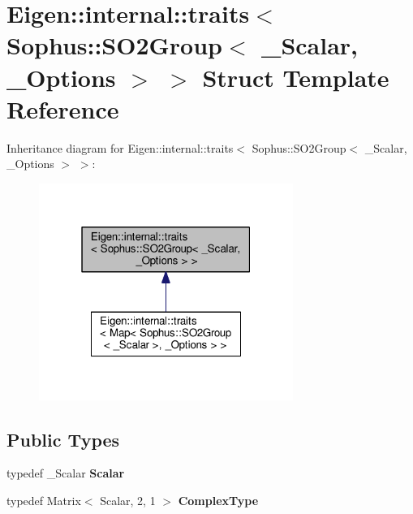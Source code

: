 \hypertarget{struct_eigen_1_1internal_1_1traits_3_01_sophus_1_1_s_o2_group_3_01___scalar_00_01___options_01_4_01_4}{}\section{Eigen\+:\+:internal\+:\+:traits$<$ Sophus\+:\+:S\+O2\+Group$<$ \+\_\+\+Scalar, \+\_\+\+Options $>$ $>$ Struct Template Reference}
\label{struct_eigen_1_1internal_1_1traits_3_01_sophus_1_1_s_o2_group_3_01___scalar_00_01___options_01_4_01_4}


Inheritance diagram for Eigen\+:\+:internal\+:\+:traits$<$ Sophus\+:\+:S\+O2\+Group$<$ \+\_\+\+Scalar, \+\_\+\+Options $>$ $>$\+:
\nopagebreak
\begin{figure}[H]
\begin{center}
\leavevmode
\includegraphics[width=235pt]{struct_eigen_1_1internal_1_1traits_3_01_sophus_1_1_s_o2_group_3_01___scalar_00_01___options_01_4_01_4__inherit__graph}
\end{center}
\end{figure}
\subsection*{Public Types}
\begin{DoxyCompactItemize}
\item 
typedef \+\_\+\+Scalar {\bfseries Scalar}\hypertarget{struct_eigen_1_1internal_1_1traits_3_01_sophus_1_1_s_o2_group_3_01___scalar_00_01___options_01_4_01_4_ac3bb3283c5bb5a0e895da736441a1217}{}\label{struct_eigen_1_1internal_1_1traits_3_01_sophus_1_1_s_o2_group_3_01___scalar_00_01___options_01_4_01_4_ac3bb3283c5bb5a0e895da736441a1217}

\item 
typedef Matrix$<$ Scalar, 2, 1 $>$ {\bfseries Complex\+Type}\hypertarget{struct_eigen_1_1internal_1_1traits_3_01_sophus_1_1_s_o2_group_3_01___scalar_00_01___options_01_4_01_4_a89825a8472878143fb665bdcc9c1c78f}{}\label{struct_eigen_1_1internal_1_1traits_3_01_sophus_1_1_s_o2_group_3_01___scalar_00_01___options_01_4_01_4_a89825a8472878143fb665bdcc9c1c78f}

\end{DoxyCompactItemize}


